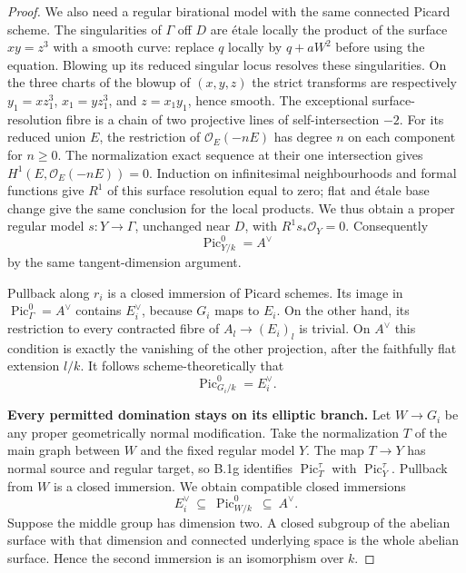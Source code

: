 \begin{proof}
We also need a regular birational model with the same connected
Picard scheme.  The singularities of $\Gamma$ off $D$ are
\'etale locally the product of the surface
$xy=z^3$ with a smooth curve: replace $q$ locally by
$q+aW^2$ before using the equation.  Blowing up its reduced singular
locus resolves these singularities.  On the three charts of
the blowup of $(x,y,z)$ the strict transforms are respectively
$y_1=xz_1^3$, $x_1=yz_1^3$, and $z=x_1y_1$, hence smooth.
The exceptional surface-resolution fibre is a chain of two
projective lines of self-intersection $-2$.
For its reduced union $E$, the restriction of
$\mathcal O_E(-nE)$ has degree $n$ on each component for
$n\ge0$.  The normalization exact sequence at their one
intersection gives $H^1(E,\mathcal O_E(-nE))=0$.
Induction on infinitesimal neighbourhoods and formal functions
give $R^1$ of this surface resolution equal to zero; flat and
\'etale base change give the same conclusion for the local
products.  We thus obtain a proper regular model
$s:Y\to\Gamma$, unchanged near $D$, with
$R^1s_*\mathcal O_Y=0$.  Consequently
\[
                    \operatorname{Pic}^0_{Y/k}=A^\vee
                    \tag{B.2.11}
\]
by the same tangent-dimension argument.

Pullback along $r_i$ is a closed immersion of Picard schemes.
Its image in $\operatorname{Pic}^0_\Gamma=A^\vee$ contains
$E_i^\vee$, because $G_i$ maps to $E_i$.  On the other hand,
its restriction to every contracted fibre of
$A_l\to(E_i)_l$ is trivial.  On $A^\vee$ this condition is
exactly the vanishing of the other projection, after the
faithfully flat extension $l/k$.  It follows scheme-theoretically
that
\[
                    \operatorname{Pic}^0_{G_i/k}=E_i^\vee.
                    \tag{B.2.12}
\]

\par\smallskip\noindent\textbf{Every permitted domination stays on its elliptic branch.}\quad
Let $W\to G_i$ be any proper geometrically normal modification.
Take the normalization $T$ of the main graph between $W$ and
the fixed regular model $Y$.  The map $T\to Y$ has normal
source and regular target, so B.1g identifies
$\operatorname{Pic}^{\tau}_T$ with
$\operatorname{Pic}^{\tau}_Y$.  Pullback from $W$ is a closed
immersion.  We obtain compatible closed immersions
\[
       E_i^\vee\ \subseteq\ \operatorname{Pic}^0_{W/k}
              \ \subseteq\ A^\vee.                 \tag{B.2.13}
\]
Suppose the middle group has dimension two.  A closed subgroup
of the abelian surface with that dimension and connected
underlying space is the whole abelian surface.  Hence the
second immersion is an isomorphism over $k$.


\end{proof}
